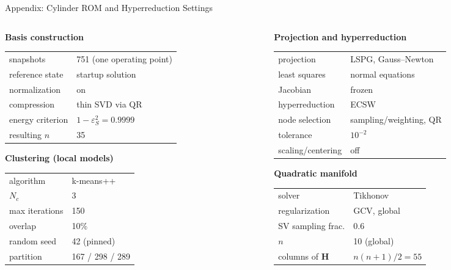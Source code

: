 \documentclass[aspectratio=169]{beamer}
\begin{document}
\begin{frame}{Appendix: Cylinder ROM and Hyperreduction Settings}
\scriptsize
\begin{columns}[T,onlytextwidth]
\begin{column}{0.49\textwidth}
\textbf{Basis construction}
\begin{tabular}{ll}
snapshots            & 751 (one operating point) \\
reference state      & startup solution \\
normalization        & on \\
compression          & thin SVD via QR \\
energy criterion     & $1-\varepsilon_S^2 = 0.9999$ \\
resulting $n$        & 35
\end{tabular}

\vspace{0.5em}
\textbf{Clustering (local models)}
\begin{tabular}{ll}
algorithm       & k-means++ \\
$N_c$           & 3 \\
max iterations  & 150 \\
overlap         & 10\% \\
random seed     & 42 (pinned) \\
partition       & 167 / 298 / 289
\end{tabular}
\end{column}
\begin{column}{0.49\textwidth}
\textbf{Projection and hyperreduction}
\begin{tabular}{ll}
projection        & LSPG, Gauss--Newton \\
least squares     & normal equations \\
Jacobian          & frozen \\
hyperreduction    & ECSW \\
node selection    & sampling/weighting, QR \\
tolerance         & $10^{-2}$ \\
scaling/centering & off
\end{tabular}

\vspace{0.5em}
\textbf{Quadratic manifold}
\begin{tabular}{ll}
solver            & Tikhonov \\
regularization    & GCV, global \\
SV sampling frac. & 0.6 \\
$n$               & 10 (global) \\
columns of $\mathbf{H}$ & $n(n+1)/2=55$
\end{tabular}
\end{column}
\end{columns}


\end{frame}
\end{document}
